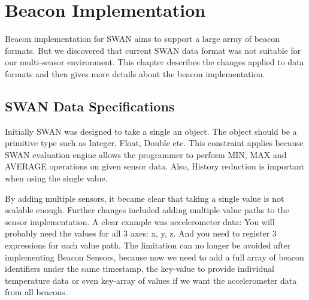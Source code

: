 
\chapter{Beacon Implementation}%

\label{Chapter4} %

Beacon implementation for SWAN aims to support a large array of beacon formats. But we discovered that current SWAN data format was not suitable 
for our multi-sensor environment. This chapter describes the changes applied to data formats and then gives more details about the beacon implementation.


\section{SWAN Data Specifications}\label{ssec:swandataspecifications} 

Initially SWAN was designed to take a single an object.
The object should be a primitive type such as Integer, Float, Double etc.
This constraint applies because SWAN evaluation engine allows the programmer to perform MIN, MAX and AVERAGE operations on given sensor data.
Also, History reduction is important when using the single value.

By adding multiple sensors, it became clear that taking a single value is not scalable enough. 
Further changes included adding multiple value paths to the sensor implementation. 
A clear example was accelerometer data: You will probably need the values for all 3 axes: x, y, z.
And you need to register 3 expressions for each value path.
The limitation can no longer be avoided after implementing Beacon Sensors, because now we need to add a full array of beacon identifiers under the same timestamp,
the key-value to provide individual temperature data or even key-array of values if we want the accelerometer data from all beacons.

